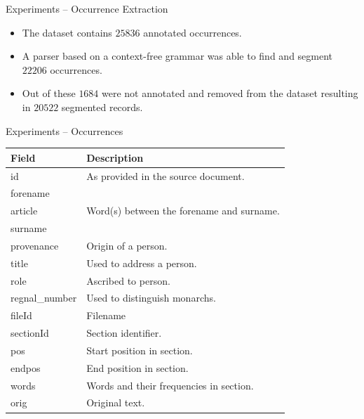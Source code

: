 \documentclass[12pt]{beamer}
\theoremstyle{break}
\begin{document}


\begin{frame}{Experiments -- Occurrence Extraction}

	\begin{itemize}
		\item The dataset contains $25 836$ 	annotated occurrences.
		\item A parser based on a context-free grammar was able to find and segment $22 206$ occurrences.
		\item Out of these $1684$ were not annotated and removed from the dataset resulting in $20 522$ segmented records.
		\end{itemize}

\end{frame}




\begin{frame}{Experiments -- Occurrences}

\begin{table}
	\footnotesize
    \centering
    \begin{tabular}{l l}
        \toprule
        \textbf{Field} & \textbf{Description}\\
        \midrule
        id & As provided in the source document.\\
        forename & \\
        article & Word(s) between the forename and surname.\\
        surname & \\
        provenance & Origin of a person.\\
        title & Used to address a person. \\
        role & Ascribed to person.\\
        regnal\_number & Used to distinguish monarchs.\\
        fileId & Filename \\
        sectionId & Section identifier. \\
        pos & Start position in section. \\
        endpos & End position in section. \\
        words & Words and their frequencies in section.\\
        orig & Original text.\\
        \bottomrule
    \end{tabular}
\end{table}

\end{frame}
\end{document}
